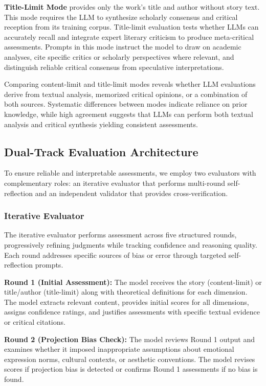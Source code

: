 \textbf{Title-Limit Mode} provides only the work's title and author without story text. This mode requires the LLM to synthesize scholarly consensus and critical reception from its training corpus. Title-limit evaluation tests whether LLMs can accurately recall and integrate expert literary criticism to produce meta-critical assessments. Prompts in this mode instruct the model to draw on academic analyses, cite specific critics or scholarly perspectives where relevant, and distinguish reliable critical consensus from speculative interpretations.

Comparing content-limit and title-limit modes reveals whether LLM evaluations derive from textual analysis, memorized critical opinions, or a combination of both sources. Systematic differences between modes indicate reliance on prior knowledge, while high agreement suggests that LLMs can perform both textual analysis and critical synthesis yielding consistent assessments.

\subsection{Dual-Track Evaluation Architecture}

To ensure reliable and interpretable assessments, we employ two evaluators with complementary roles: an iterative evaluator that performs multi-round self-reflection and an independent validator that provides cross-verification.

\subsubsection{Iterative Evaluator}

The iterative evaluator performs assessment across five structured rounds, progressively refining judgments while tracking confidence and reasoning quality. Each round addresses specific sources of bias or error through targeted self-reflection prompts.

\textbf{Round 1 (Initial Assessment):} The model receives the story (content-limit) or title/author (title-limit) along with theoretical definitions for each dimension. The model extracts relevant content, provides initial scores for all dimensions, assigns confidence ratings, and justifies assessments with specific textual evidence or critical citations.

\textbf{Round 2 (Projection Bias Check):} The model reviews Round 1 output and examines whether it imposed inappropriate assumptions about emotional expression norms, cultural contexts, or aesthetic conventions. The model revises scores if projection bias is detected or confirms Round 1 assessments if no bias is found.

